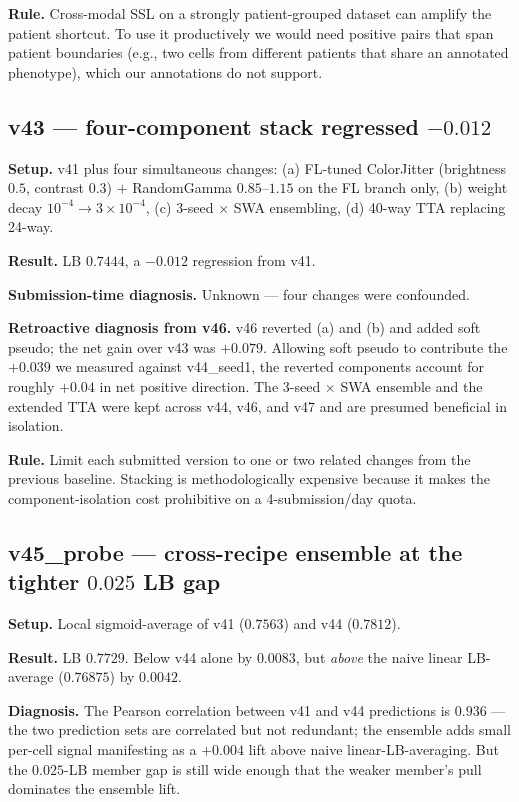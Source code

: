 \documentclass[conference]{IEEEtran}
\begin{document}
\textbf{Rule.} Cross-modal SSL on a strongly patient-grouped dataset can amplify the patient shortcut. To use it productively we would need positive pairs that span patient boundaries (e.g., two cells from different patients that share an annotated phenotype), which our annotations do not support.

\subsection{v43 --- four-component stack regressed $-0.012$}

\textbf{Setup.} v41 plus four simultaneous changes: (a) FL-tuned ColorJitter (brightness $0.5$, contrast $0.3$) $+$ RandomGamma $0.85$--$1.15$ on the FL branch only, (b) weight decay $10^{-4} \rightarrow 3\times 10^{-4}$, (c) 3-seed $\times$ SWA ensembling, (d) 40-way TTA replacing 24-way.

\textbf{Result.} LB $0.7444$, a $-0.012$ regression from v41.

\textbf{Submission-time diagnosis.} Unknown --- four changes were confounded.

\textbf{Retroactive diagnosis from v46.} v46 reverted (a) and (b) and added soft pseudo; the net gain over v43 was $+0.079$. Allowing soft pseudo to contribute the $+0.039$ we measured against v44\_seed1, the reverted components account for roughly $+0.04$ in net positive direction. The 3-seed $\times$ SWA ensemble and the extended TTA were kept across v44, v46, and v47 and are presumed beneficial in isolation.

\textbf{Rule.} Limit each submitted version to one or two related changes from the previous baseline. Stacking is methodologically expensive because it makes the component-isolation cost prohibitive on a 4-submission/day quota.

\subsection{v45\_probe --- cross-recipe ensemble at the tighter $0.025$ LB gap}

\textbf{Setup.} Local sigmoid-average of v41 ($0.7563$) and v44 ($0.7812$).

\textbf{Result.} LB $0.7729$. Below v44 alone by $0.0083$, but \emph{above} the naive linear LB-average ($0.76875$) by $0.0042$.

\textbf{Diagnosis.} The Pearson correlation between v41 and v44 predictions is $0.936$ --- the two prediction sets are correlated but not redundant; the ensemble adds small per-cell signal manifesting as a $+0.004$ lift above naive linear-LB-averaging. But the $0.025$-LB member gap is still wide enough that the weaker member's pull dominates the ensemble lift.
\end{document}
